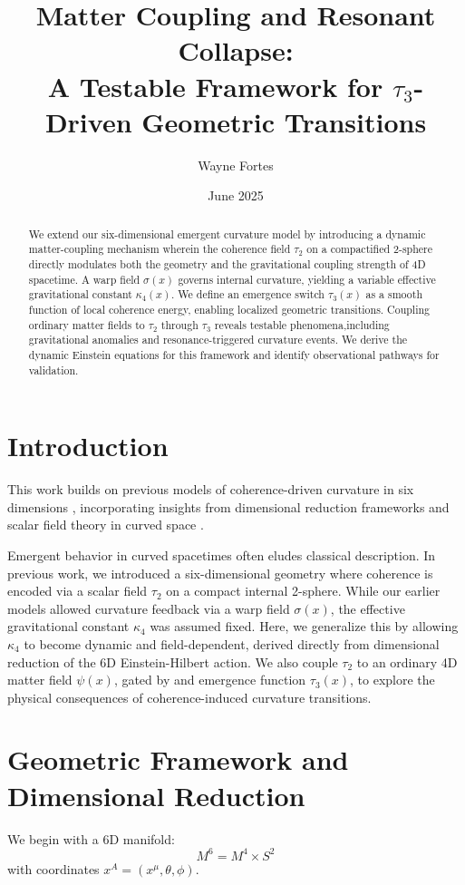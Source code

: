 \documentclass[12pt]{article}
\title{Matter Coupling and Resonant Collapse:\\A Testable Framework for $\tau_3$-Driven Geometric Transitions}
\author{Wayne Fortes}
\date{June 2025}
\begin{document}
\maketitle

\begin{abstract}
We extend our six-dimensional emergent curvature model by introducing a dynamic matter-coupling mechanism wherein the coherence field $\tau_2$ on a compactified 2-sphere directly modulates both the geometry and the gravitational coupling strength of 4D spacetime. A warp field $\sigma(x)$ governs internal curvature, yielding a variable effective gravitational constant $\kappa_4(x)$. We define an emergence switch $\tau_3(x)$ as a smooth function of local coherence energy, enabling localized geometric transitions. Coupling ordinary matter fields to $\tau_2$ through $\tau_3$ reveals testable phenomena,including gravitational anomalies and resonance-triggered curvature events. We derive the dynamic Einstein equations for this framework and identify observational pathways for validation.
\end{abstract}

\section{Introduction}
This work builds on previous models of coherence-driven curvature in six dimensions \cite{fortes2025a,fortes2025b}, incorporating insights from dimensional reduction frameworks \cite{mtw1973,appelquist1987} and scalar field theory in curved space \cite{birrell1982}.

Emergent behavior in curved spacetimes often eludes classical description. In previous work, we introduced a six-dimensional geometry where coherence is encoded via a scalar field $\tau_2$ on a compact internal 2-sphere. While our earlier models allowed curvature feedback via a warp field $\sigma(x)$, the effective gravitational constant $\kappa_4$ was assumed fixed. Here, we generalize this by allowing $\kappa_4$ to become dynamic and field-dependent, derived directly from dimensional reduction of the 6D Einstein-Hilbert action. We also couple $\tau_2$ to an ordinary 4D matter field  $\psi(x)$, gated by and emergence function $\tau_3(x)$, to explore the physical consequences of coherence-induced curvature transitions.

 

\section{Geometric Framework and Dimensional Reduction}
We begin with a 6D manifold:
\[
M^6 = M^4 \times S^2
\]
with coordinates $x^A = (x^\mu, \theta, \phi)$.
\end{document}
